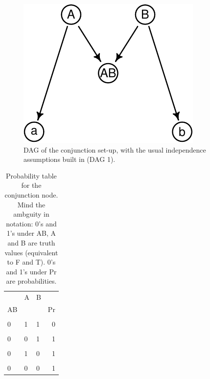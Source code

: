 \documentclass[
  10pt,
  dvipsnames,enabledeprecatedfontcommands]{scrartcl}
\begin{document}
\begin{figure}[H]

\begin{center}\includegraphics[width=0.6\linewidth]{conjunction-paradox4_files/figure-latex/fig:conjunctionDAG-1} \end{center}

\caption{\textsf{DAG} of the conjunction set-up, with the usual independence assumptions built in (\textsf{DAG 1}).}
\label{fig:conjunctionDAGchapter}
\end{figure}

\begin{table}
\begin{tabular}{lllr}
\toprule
\multicolumn{1}{c}{} & \multicolumn{1}{c}{A} & \multicolumn{1}{c}{B} & \multicolumn{1}{c}{} \\
AB &  &  & Pr\\
\midrule
\cellcolor{gray!6}{1} & \cellcolor{gray!6}{1} & \cellcolor{gray!6}{1} & \cellcolor{gray!6}{1}\\
0 & 1 & 1 & 0\\
\cellcolor{gray!6}{1} & \cellcolor{gray!6}{0} & \cellcolor{gray!6}{1} & \cellcolor{gray!6}{0}\\
0 & 0 & 1 & 1\\
\cellcolor{gray!6}{1} & \cellcolor{gray!6}{1} & \cellcolor{gray!6}{0} & \cellcolor{gray!6}{0}\\
0 & 1 & 0 & 1\\
\cellcolor{gray!6}{1} & \cellcolor{gray!6}{0} & \cellcolor{gray!6}{0} & \cellcolor{gray!6}{0}\\
0 & 0 & 0 & 1\\
\bottomrule
\end{tabular}

\caption{Probability table for the conjunction node. Mind the ambguity in notation:  0's and 1's under AB, A and B are truth values (equivalent to F and T).  0's and 1's under Pr are probabilities.}
\label{tab:CPTconjunction}
\end{table}
\end{document}
